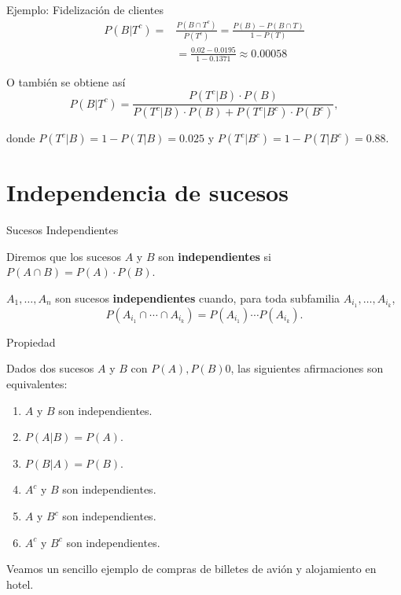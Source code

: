 \documentclass[
  letterpaper,
  DIV=11,
  numbers=noendperiod]{scrreprt}
\providecommand{\tightlist}{%
  \setlength{\itemsep}{0pt}\setlength{\parskip}{0pt}}\usepackage{longtable,booktabs,array}
\begin{document}
\begin{Ejemplo}{Ejemplo: Fidelización de clientes}{}
\[
\begin{array}{rl}
P(B|T^c)= &\displaystyle \frac{P(B\cap T^c)}{P(T^c)}=
\frac{P(B)-P(B\cap T)}{1-P(T)}\\[2ex] & \displaystyle =
\frac{0.02-0.0195}{1-0.1371}\approx 0.00058
\end{array}
\]

O también se obtiene así \[
    P(B|T^c)=\frac{P(T^c|B)\cdot P(B)}{P(T^c|B)\cdot P(B)+P(T^c|B^c)\cdot P(B^c)},
    \]

donde \(P(T^c|B)=1-P(T|B)=0.025\) y \(P(T^c|B^c)=1-P(T|B^c)=0.88.\)

\end{Ejemplo}

\section{Independencia de sucesos}\label{independencia-de-sucesos}

\begin{Definicion}{Sucesos Independientes}{}

Diremos que los sucesos \(A\) y \(B\) son \textbf{independientes} si
\(P(A\cap B)=P(A)\cdot P(B)\).

\(A_1,\ldots, A_n\) son sucesos \textbf{independientes} cuando, para
toda subfamilia \(A_{i_1},\ldots,A_{i_k}\), \[
P(A_{i_1}\cap \cdots\cap A_{i_k})=P(A_{i_1})\cdots P(A_{i_k}).
\]

\end{Definicion}

\begin{Proposicion}{Propiedad}{}

Dados dos sucesos \(A\) y \(B\) con \(P(A),P(B)0\), las siguientes
afirmaciones son equivalentes:

\begin{enumerate}
\def\labelenumi{\arabic{enumi}.}
\tightlist
\item
  \(A\) y \(B\) son independientes.
\item
  \(P(A|B)=P(A)\).
\item
  \(P(B|A)=P(B)\).
\item
  \(A^c\) y \(B\) son independientes.
\item
  \(A\) y \(B^c\) son independientes.
\item
  \(A^c\) y \(B^c\) son independientes.
\end{enumerate}

\end{Proposicion}

Veamos un sencillo ejemplo de compras de billetes de avión y alojamiento
en hotel.
\end{document}
